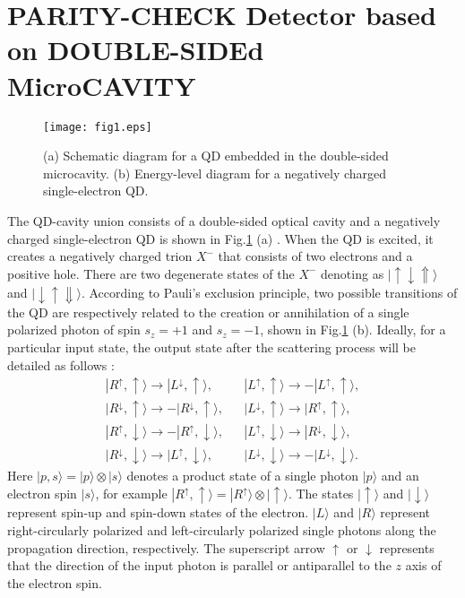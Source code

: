 \documentclass[aps,graphicx,twocolumn]{revtex4}%
\begin{document}
\section{PARITY-CHECK Detector based on DOUBLE-SIDEd MicroCAVITY}


\begin{figure}[!tpb]
  \centering
  \texttt{[image: fig1.eps]}\\
  \caption{(a) Schematic diagram for a QD embedded in the double-sided microcavity. (b) Energy-level diagram for a negatively charged single-electron QD. }\label{fig1}
\end{figure}


The QD-cavity union consists of a double-sided optical cavity and a negatively charged single-electron QD is shown in Fig.\ref{fig1} (a) \cite{QD2,QD.2}. When the QD is excited, it creates a negatively charged trion $X^-$ that consists of two electrons and a positive hole. There are two degenerate states of the $X^-$ denoting as $|\!\!\uparrow\downarrow\Uparrow\rangle$ and $|\!\!\downarrow\uparrow\Downarrow\rangle$. According to Pauli's exclusion principle,  two possible transitions of the QD are respectively related to the creation or annihilation of a single polarized photon of spin $s_{z}=+1$  and $s_{z}=-1$, shown in Fig.\ref{fig1} (b). Ideally, for a particular input state, the output state after the scattering process will be detailed as follows \cite{QD2,QD.2}:
\begin{equation}\label{mcf}
  \begin{aligned}
&|R^{\uparrow},\uparrow\rangle\rightarrow|L^{\downarrow},\uparrow\rangle,&
&|L^{\uparrow},\uparrow\rangle\rightarrow-|L^{\uparrow},\uparrow\rangle,&\\
&|R^{\downarrow},\uparrow\rangle\rightarrow-|R^{\downarrow},\uparrow\rangle,&
&|L^{\downarrow},\uparrow\rangle\rightarrow|R^{\uparrow},\uparrow\rangle,&\\
&|R^{\uparrow},\downarrow\rangle\rightarrow-|R^{\uparrow},\downarrow\rangle,&
&|L^{\uparrow},\downarrow\rangle\rightarrow|R^{\downarrow},\downarrow\rangle,&\\
&|R^{\downarrow},\downarrow\rangle\rightarrow|L^{\uparrow},\downarrow\rangle,&
&|L^{\downarrow},\downarrow\rangle\rightarrow-|L^{\downarrow},\downarrow\rangle.&
  \end{aligned}
\end{equation}
Here $|p,s\rangle=|p\rangle\otimes|s\rangle$ denotes a product state of a single photon $|p\rangle$ and an electron spin $|s\rangle$, for example $|R^{\uparrow},\uparrow\rangle=|R^{\uparrow}\rangle\otimes|\uparrow\rangle$. The states $|\uparrow\rangle$ and $|\downarrow\rangle$ represent spin-up and spin-down states of the electron. $|L\rangle$ and $|R\rangle$ represent right-circularly polarized and left-circularly polarized single photons along the propagation direction, respectively. The superscript arrow $\uparrow$ or ${\downarrow}$ represents that the direction of the input photon is parallel or antiparallel to the $z$ axis of the electron spin.
\end{document}
